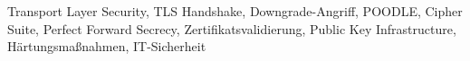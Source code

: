 \documentclass[conference]{IEEEtran}
\begin{document}
\begin{IEEEkeywords}
Transport Layer Security, TLS Handshake, Downgrade-Angriff,
POODLE, Cipher Suite, Perfect Forward Secrecy, Zertifikatsvalidierung,
Public Key Infrastructure, Härtungsmaßnahmen, IT-Sicherheit
\end{IEEEkeywords}






\appendices




\end{document}
